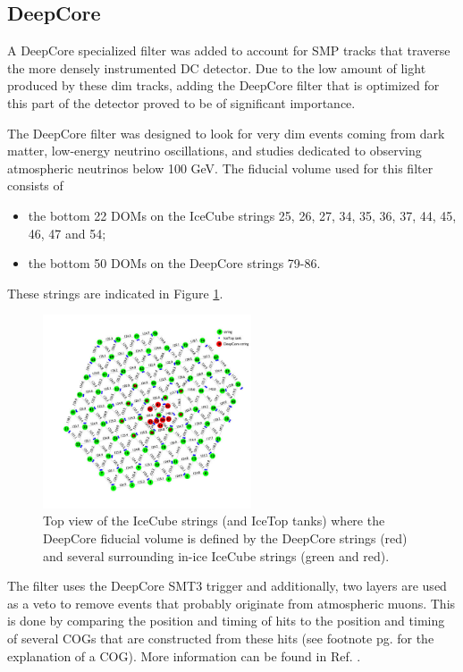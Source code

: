 \subsection{DeepCore}
A DeepCore specialized filter was added to account for SMP tracks that traverse the more densely instrumented DC detector. Due to the low amount of light produced by these dim tracks, adding the DeepCore filter that is optimized for this part of the detector proved to be of significant importance.

The DeepCore filter was designed to look for very dim events coming from dark matter, low-energy neutrino oscillations, and studies dedicated to observing atmospheric neutrinos below 100 GeV. The fiducial volume used for this filter consists of
\vspace{2mm}
\begin{itemize}
\item the bottom 22 DOMs on the IceCube strings 25, 26, 27, 34, 35, 36, 37, 44, 45, 46, 47 and 54;
\item the bottom 50 DOMs on the DeepCore strings 79-86.
\end{itemize}
\vspace{2mm}
These strings are indicated in Figure \ref{fig:deepcorestrings}.\\

\begin{figure}[t]
\centering
\includegraphics[width=0.55\textwidth]{chapter8/img/stringview.jpg}
\caption{Top view of the IceCube strings (and IceTop tanks) where the DeepCore fiducial volume is defined by the DeepCore strings (red) and several surrounding in-ice IceCube strings (green and red).}
\label{fig:deepcorestrings}
\end{figure}

\noindent The filter uses the DeepCore SMT3 trigger and additionally, two layers are used as a veto to remove events that probably originate from atmospheric muons. This is done by comparing the position and timing of hits to the position and timing of several COGs that are constructed from these hits (see footnote pg. \pageref{footnote:cog} for the explanation of a COG). More information can be found in Ref. \cite{DeepCore2012}.

